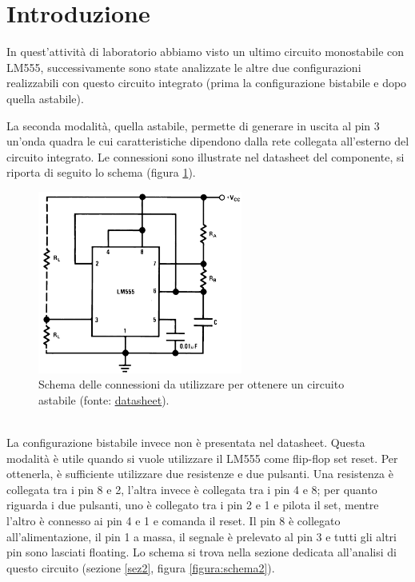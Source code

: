 \documentclass{report}
\begin{document}
\section*{Introduzione}
In quest'attività di laboratorio abbiamo visto un ultimo circuito monostabile con LM555, successivamente sono state analizzate le altre due configurazioni realizzabili con questo circuito integrato (prima la configurazione bistabile e dopo quella astabile).  \par
La seconda modalità, quella astabile, permette di generare in uscita al pin 3 un'onda quadra le cui caratteristiche dipendono dalla rete collegata all'esterno del circuito integrato. Le connessioni sono illustrate nel datasheet del componente, si riporta di seguito lo schema (figura \ref{figura:datasheet1}).
\begin{figure}[h!]
	\centering
	\includegraphics[height=6cm]{immagini/datasheet1}
	\caption{Schema delle connessioni da utilizzare per ottenere un circuito astabile (fonte: \textcolor{blue}{\underline{\href{https://www.ti.com/lit/ds/symlink/lm555.pdf?ts=1667144089940&ref_url=https\%253A\%252F\%252Fwww.ti.com\%252Fproduct\%252FLM555}{datasheet}}}).} %
	\label{figura:datasheet1}
\end{figure}
\\ La configurazione bistabile invece non è presentata nel datasheet. Questa modalità è utile quando si vuole utilizzare il LM555 come flip-flop set reset. Per ottenerla, è sufficiente utilizzare due resistenze e due pulsanti. Una resistenza è collegata tra i pin 8 e 2, l'altra invece è collegata tra i pin 4 e 8; per quanto riguarda i due pulsanti, uno è collegato tra i pin 2 e 1 e pilota il set, mentre l'altro è connesso ai pin 4 e 1 e comanda il reset. Il pin 8 è collegato all'alimentazione, il pin 1 a massa, il segnale è prelevato al pin 3 e tutti gli altri pin sono lasciati floating. Lo schema si trova nella sezione dedicata all'analisi di questo circuito (sezione \ref{sez2}, figura \ref{figura:schema2}).
\end{document}
